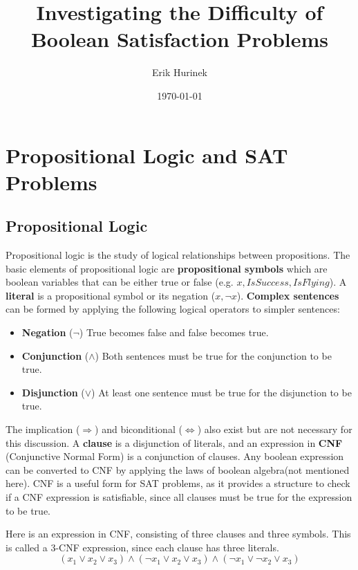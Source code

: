 \documentclass{article}
\author{Erik Hurinek}
\title{Investigating the Difficulty of Boolean Satisfaction Problems}
\date{\today}
\begin{document}
    \maketitle

    \section{Propositional Logic and SAT Problems}

    \subsection{Propositional Logic}
    Propositional logic is the study of logical relationships between propositions.\supercite{sep-logic-propositional} The basic elements of propositional logic are \textbf{propositional symbols} which are boolean variables that can be either true or false (e.g. \(x, IsSuccess, IsFlying\)). A \textbf{literal} is a propositional symbol or its negation (\(x, \neg x \)). \textbf{Complex sentences} can be formed by applying the following logical operators to simpler sentences:  

    \begin{itemize}
        \item \textbf{Negation} ($\neg$) True becomes false and false becomes true.
        \item \textbf{Conjunction} ($\land$) Both sentences must be true for the conjunction to be true.
        \item \textbf{Disjunction} ($\lor$) At least one sentence must be true for the disjunction to be true.
    \end{itemize}

    The implication ($\Rightarrow$) and biconditional ($\Leftrightarrow$) also exist but are not necessary for this discussion. A \textbf{clause} is a disjunction of literals, and an expression in \textbf{CNF} (Conjunctive Normal Form) is a conjunction of clauses. Any boolean expression can be converted to CNF by applying the laws of boolean algebra\supercite{Norvig_2021}(not mentioned here). CNF is a useful form for SAT problems, as it provides a structure to check if a CNF expression is satisfiable, since all clauses must be true for the expression to be true.

    Here is an expression in CNF, consisting of three clauses and three symbols. This is called a 3-CNF expression, since each clause has three literals.
    \begin{equation*}
        (x_1 \lor x_2 \lor x_3) \land (\neg x_1 \lor x_2 \lor x_3) \land (\neg x_1 \lor \neg x_2 \lor x_3)
    \end{equation*}
\end{document}
